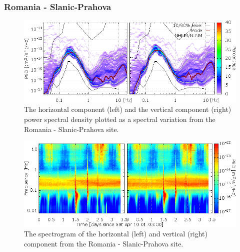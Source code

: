 \subsubsection*{Romania - Slanic-Prahova}
\begin{figure}[h]
\centering
\includegraphics[width=\textwidth]{./Sec_SiteInfra/Figures/results/Slanic-A_multiplot1}
\caption{The horizontal component (left) and the vertical component (right) power spectral density plotted as a spectral variation from the Romania - Slanic-Prahova site.}
\label{fig:Slanic-A_multiplot1}
\end{figure}\begin{figure}[h]
\centering
\includegraphics[width=\textwidth]{./Sec_SiteInfra/Figures/results/Slanic-A_multiplot2}
\caption{The spectrogram of the horizontal (left) and vertical (right) component from the Romania - Slanic-Prahova site.}
\label{fig:Slanic-A_multiplot2}
\end{figure}

\pagebreak
\FloatBarrier

